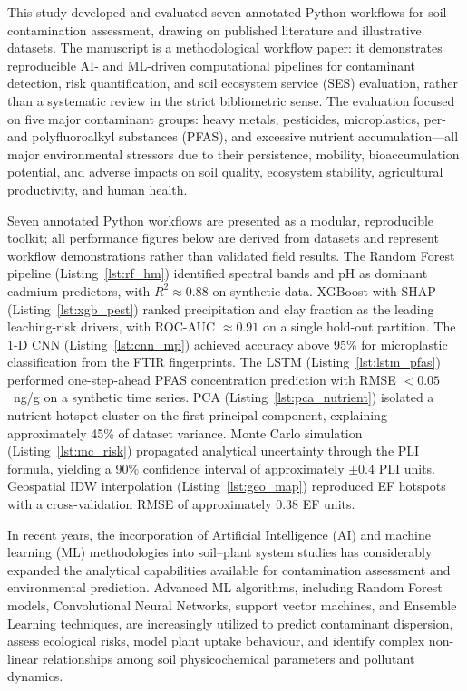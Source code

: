 \documentclass[environremediat,article,accept,pdftex,oneauthor]{Definitions/mdpi}
\begin{document}
{This study developed and evaluated seven annotated Python workflows for soil contamination assessment, drawing on published literature and illustrative datasets. The manuscript is a methodological workflow paper: it demonstrates reproducible AI- and ML-driven computational pipelines for contaminant detection, risk quantification, and soil ecosystem service (SES) evaluation, rather than a systematic review in the strict bibliometric sense.} The evaluation focused on five major contaminant groups: heavy metals, pesticides, microplastics, per- and polyfluoroalkyl substances (PFAS), and excessive nutrient accumulation---all major environmental stressors due to their persistence, mobility, bioaccumulation potential, and adverse impacts on soil quality, ecosystem stability, agricultural productivity, and human health.

{Seven annotated Python workflows are presented as a modular, reproducible toolkit; all performance figures below are derived from datasets and represent workflow demonstrations rather than validated field results. The Random Forest pipeline (Listing~\ref{lst:rf_hm}) identified spectral bands and pH as dominant cadmium predictors, with $R^2 \approx 0.88$ on synthetic data. XGBoost with SHAP (Listing~\ref{lst:xgb_pest}) ranked precipitation and clay fraction as the leading leaching-risk drivers, with ROC-AUC $\approx 0.91$ on a single hold-out partition. The 1-D CNN (Listing~\ref{lst:cnn_mp}) achieved accuracy above 95\% for microplastic classification from the FTIR fingerprints. The LSTM (Listing~\ref{lst:lstm_pfas}) performed one-step-ahead PFAS concentration prediction with RMSE $< 0.05$~ng/g on a synthetic time series. PCA (Listing~\ref{lst:pca_nutrient}) isolated a nutrient hotspot cluster on the first principal component, explaining approximately 45\% of dataset variance. Monte Carlo simulation (Listing~\ref{lst:mc_risk}) propagated analytical uncertainty through the PLI formula, yielding a 90\% confidence interval of approximately $\pm 0.4$ PLI units. Geospatial IDW interpolation (Listing~\ref{lst:geo_map}) reproduced EF hotspots with a cross-validation RMSE of approximately 0.38 EF units.}

In recent years, the incorporation of Artificial Intelligence (AI) and machine
learning (ML) methodologies into soil--plant system studies has considerably
expanded the analytical capabilities available for contamination assessment
and environmental prediction. Advanced ML algorithms, including Random Forest
models, Convolutional Neural Networks, support vector machines, and Ensemble
Learning techniques, are increasingly utilized to predict contaminant
dispersion, assess ecological risks, model plant uptake behaviour, and identify
complex non-linear relationships among soil physicochemical parameters and
pollutant dynamics.
\end{document}
